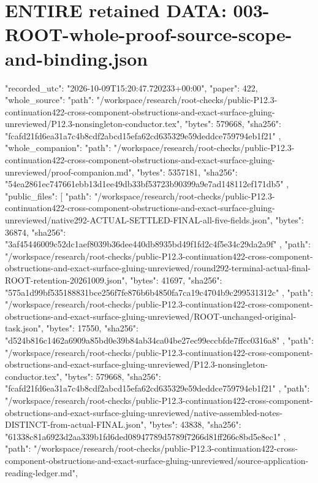\documentclass[11pt]{article}
\begin{document}
\section{ENTIRE retained DATA: 003-ROOT-whole-proof-source-scope-and-binding.json}
\begin{Full422Data}
{
  "recorded_utc": "2026-10-09T15:20:47.720233+00:00",
  "paper": 422,
  "whole_source": {
    "path": "/workspace/research/root-checks/public-P12.3-continuation422-cross-component-obstructions-and-exact-surface-gluing-unreviewed/P12.3-nonsingleton-conductor.tex",
    "bytes": 579668,
    "sha256": "fcafd21fd6ea31a7c4b8cdf2abcd15efa62cd635329e59deddce759794eb1f21"
  },
  "whole_companion": {
    "path": "/workspace/research/root-checks/public-P12.3-continuation422-cross-component-obstructions-and-exact-surface-gluing-unreviewed/proof-companion.md",
    "bytes": 5357181,
    "sha256": "54ea2861ec747661ebb13d1ee49db33bf53723b90399a9e7ad148112ef171db5"
  },
  "public_files": [
    {
      "path": "/workspace/research/root-checks/public-P12.3-continuation422-cross-component-obstructions-and-exact-surface-gluing-unreviewed/native292-ACTUAL-SETTLED-FINAL-all-five-fields.json",
      "bytes": 36874,
      "sha256": "3af45446009c52dc1aef8039b36dee440db8935bd49f1fd2c4f5e34c29da2a9f"
    },
    {
      "path": "/workspace/research/root-checks/public-P12.3-continuation422-cross-component-obstructions-and-exact-surface-gluing-unreviewed/round292-terminal-actual-final-ROOT-retention-20261009.json",
      "bytes": 41697,
      "sha256": "575a1d99bf535188831bce256f7fe876b6b4850fa7ca19c4704b9c299531312c"
    },
    {
      "path": "/workspace/research/root-checks/public-P12.3-continuation422-cross-component-obstructions-and-exact-surface-gluing-unreviewed/ROOT-unchanged-original-task.json",
      "bytes": 17550,
      "sha256": "d524b816c1462a6909a85bd0e39b84ab34ca04be27ec99eccbfde7ffcc0316a8"
    },
    {
      "path": "/workspace/research/root-checks/public-P12.3-continuation422-cross-component-obstructions-and-exact-surface-gluing-unreviewed/P12.3-nonsingleton-conductor.tex",
      "bytes": 579668,
      "sha256": "fcafd21fd6ea31a7c4b8cdf2abcd15efa62cd635329e59deddce759794eb1f21"
    },
    {
      "path": "/workspace/research/root-checks/public-P12.3-continuation422-cross-component-obstructions-and-exact-surface-gluing-unreviewed/native-assembled-notes-DISTINCT-from-actual-FINAL.json",
      "bytes": 43838,
      "sha256": "61338c81a6923d2aa339b1fd6ded08947789d5789f7266d81ff266c8bd5e8ec1"
    },
    {
      "path": "/workspace/research/root-checks/public-P12.3-continuation422-cross-component-obstructions-and-exact-surface-gluing-unreviewed/source-application-reading-ledger.md",
}}
\end{Full422Data}
\end{document}
